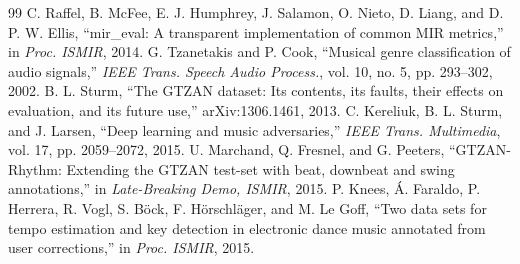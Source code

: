 \begin{thebibliography}{99}
 C. Raffel, B. McFee, E. J. Humphrey, J. Salamon, O. Nieto, D. Liang, and D. P. W. Ellis, ``mir\_eval: A transparent implementation of common MIR metrics,'' in \emph{Proc. ISMIR}, 2014.
 G. Tzanetakis and P. Cook, ``Musical genre classification of audio signals,'' \emph{IEEE Trans. Speech Audio Process.}, vol. 10, no. 5, pp. 293--302, 2002.
 B. L. Sturm, ``The GTZAN dataset: Its contents, its faults, their effects on evaluation, and its future use,'' arXiv:1306.1461, 2013.
 C. Kereliuk, B. L. Sturm, and J. Larsen, ``Deep learning and music adversaries,'' \emph{IEEE Trans. Multimedia}, vol. 17, pp. 2059--2072, 2015.
 U. Marchand, Q. Fresnel, and G. Peeters, ``GTZAN-Rhythm: Extending the GTZAN test-set with beat, downbeat and swing annotations,'' in \emph{Late-Breaking Demo, ISMIR}, 2015.
 P. Knees, \'A. Faraldo, P. Herrera, R. Vogl, S. B\"ock, F. H\"orschl\"ager, and M. Le Goff, ``Two data sets for tempo estimation and key detection in electronic dance music annotated from user corrections,'' in \emph{Proc. ISMIR}, 2015.
\end{thebibliography}